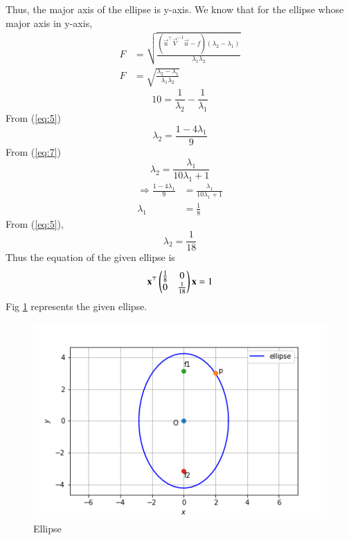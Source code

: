 \documentclass[journal,12pt,twocolumn]{IEEEtran}
\begin{document}
Thus, the major axis of the ellipse is y-axis.
We know that for the ellipse whose major axis in y-axis,
\begin{align}
    F &=\sqrt{\frac{ (\vec{u}^{\top} \vec{V}^{-1} \vec{u} - f)(\lambda_2-\lambda_1)}{\lambda_1\lambda_2}}\\
    F &= \sqrt{\frac{\lambda_2-\lambda_1}{\lambda_1\lambda_2}}
\end{align}
\begin{equation}
     10=\frac{1}{\lambda_2}-\frac{1}{\lambda_1} \label{eq:7}
\end{equation}
From (\ref{eq:5})
\begin{equation}
    \lambda_2 = \frac{1-4\lambda_1 }{9}
\end{equation}
From (\ref{eq:7})
\begin{equation}
    \lambda_2 = \frac{\lambda_1 }{10\lambda_1 + 1}
\end{equation}
\begin{align}
  \Longrightarrow  \frac{1-4\lambda_1 }{9}&=\frac{\lambda_1 }{10\lambda_1 + 1}\\
  \lambda_1&=\frac{1}{8}
\end{align}
From (\ref{eq:5}),
\begin{equation}
    \lambda_2=\frac{1}{18}
\end{equation}
Thus the equation of the given ellipse is
\begin{equation}
    \mathbf{x}^{\top}\begin{pmatrix}\frac{1}{8}&0\\0&\frac{1}{18}\end{pmatrix}\mathbf{x} = 1
\end{equation}
Fig \ref{fig:1} represents the given ellipse.
\begin{figure}[H]
\centering
    \includegraphics[width= \columnwidth]{assignment6.png}
    \caption{Ellipse} \label{fig:1}
\end{figure}
\end{document}
